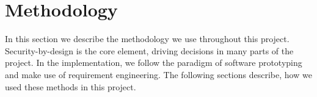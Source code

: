 \section{Methodology}\label{sec:methodology}
% 
In this section we describe the methodology we use throughout this project. Security-by-design is the core element, driving decisions in many parts of the project. In the implementation, we follow the paradigm of software prototyping and make use of requirement engineering. The following sections describe, how we used these methods in this project.
% 

% 

% 
